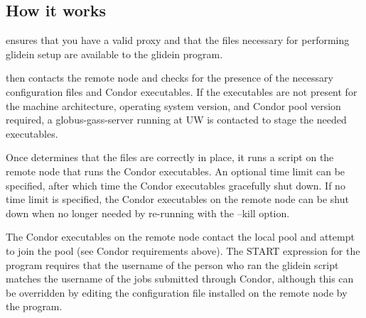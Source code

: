 \subsection{How it works}
 ensures that you have a valid proxy and that the files
necessary for performing glidein setup are available to the glidein
program. 

 then contacts the remote node and checks for the
presence of the necessary configuration files and Condor executables.
If the executables are not present for the machine architecture, 
operating system version, and Condor pool version required, a 
globus-gass-server running at UW is contacted to stage the needed
executables.

Once  determines that the files are correctly in place,
it runs a script on the remote node that runs the Condor executables.
An optional time limit can be specified, after which time the Condor 
executables gracefully shut down. If no time limit is specified, the 
Condor executables on the remote node can be shut down when no longer
needed by re-running  with the --kill option.

The Condor executables on the remote node contact the local pool and
attempt to join the pool (see Condor requirements above). The START
expression for the  program requires that the username
of the person who ran the glidein script matches the username of the
jobs submitted through Condor, although this can be overridden by
editing the configuration file installed on the remote node by the
 program.

